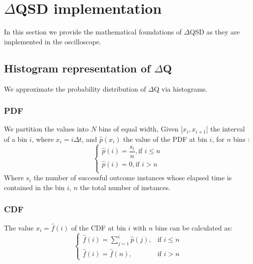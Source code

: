 \section{$\Delta$QSD implementation}
    In this section we provide the mathematical foundations of $\Delta$QSD as they are implemented in the oscilloscope.
    \subsection{Histogram representation of $\Delta$Q}
    We approximate the probability distribution of $\Delta$Q via histograms.
   \subsubsection{PDF}
   We partition the values into $N$ bins of equal width, Given $\lbrack x_i, x_{i+1} \rbrack$ the interval of a bin $i$, where $x_i = i\Delta t$, and $\hat{p}(x_i)$ the value of the PDF at bin $i$, for $n$ bins \cite{stat}:
        \begin{equation}
            \begin{cases}
                \hat{p}(i) = \dfrac{s_i}{n}, \text{if } i \le n \\
                \hat{p}(i) = 0, \text{if } i > n \\
            \end{cases}
            \label{eq:pdf}
        \end{equation}
    Where $s_i$ the number of successful outcome instances whose elapsed time is contained in the bin $i$, $n$ the total number of instances. 
    \subsubsection{CDF}
        The value $x_i = \hat{f}(i)$ of the CDF at bin $i$ with $n$ bins can be calculated as:
        \begin{equation}
            \begin{cases}
                \hat{f}(i) = \sum_{j=1}^{i} \hat{p}(j), & \text{if } i \le n \\  
                \hat{f}(i) = \hat{f}(n), & \text{if } i > n 
            \end{cases}
            \label{eq:cdf}
        \end{equation}
 
